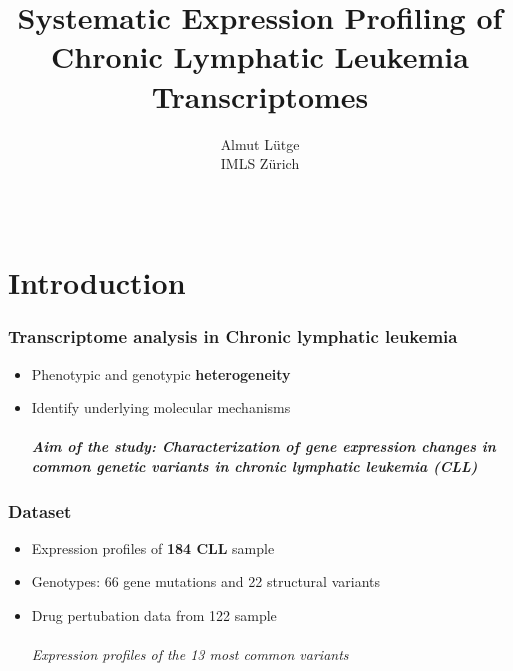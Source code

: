 \documentclass[xcolor=dvipsnames,t,10pt]{beamer}
\title[Expression profiling CLL]{Systematic Expression Profiling of Chronic Lymphatic Leukemia Transcriptomes}
\author[Almut Lütge - IMLS Zürich]{Almut Lütge\\IMLS Zürich}
\date{ \\ \bigskip {\monthyeardate{\today}}}
\begin{document}
\begin{frame}
  \titlepage
\end{frame}

%
%
%
%
\section{Introduction}
%
\begin{frame}[c]
	\frametitle{Transcriptome analysis in Chronic lymphatic leukemia}
	\begin{itemize}
	\item Phenotypic and genotypic \textbf{heterogeneity} 
	\item Identify underlying molecular mechanisms
	\\~\\
	\textbf{\textit{Aim of the study: Characterization of gene expression changes in common genetic variants in chronic lymphatic leukemia  (CLL)}}
	\end{itemize}
\end{frame}
%
%
\begin{frame}[c]
	\frametitle{Dataset}
	\begin{itemize}
		\item Expression profiles of \textbf{184 CLL} sample
		\item Genotypes: 66 gene mutations and 22 structural variants
		\item Drug pertubation data from 122 sample
		\\~\\
		\textit{Expression profiles of the 13 most common variants}
	\end{itemize}
\end{frame}
\end{document}
